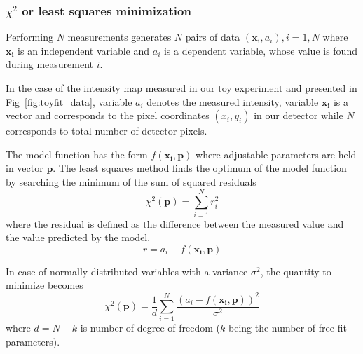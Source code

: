 \subsubsection*{$\chi^2$ or least squares minimization}
Performing $N$ measurements generates $N$ pairs of data $(\mathbf{x_{i}}, a_{i}), i=1,N$ where 
$\mathbf{x_{i}}$ is an independent variable and $a_{i}$ is a dependent variable, whose
value is found during measurement $i$.

In the case of the intensity map measured in our toy experiment 
and presented in Fig~\ref{fig:toyfit_data}, variable $a_{i}$ denotes
the measured intensity, variable $\mathbf{x_{i}}$ is a vector and
corresponds to the pixel coordinates $(x_{i}, y_{i})$ in our detector while $N$ corresponds 
to total number of detector pixels.

The model function has the form
$f(\mathbf{x_{i}},\mathbf{p})$
where adjustable parameters are held in vector $\mathbf{p}$.
The least squares method finds the optimum of the model function by searching the minimum of the sum of squared
residuals
$$ \chi^{2}(\mathbf{p}) = \sum_{i=1}^{N}r_{i}^{2}$$
where the residual is defined as the difference between the measured value and the value predicted by the model.
$$r = a_{i} - f(\mathbf{x_{i}},\mathbf{p})$$

In case of normally distributed variables with a variance $\sigma^2$,
the quantity to minimize becomes
$$ \chi^{2}(\mathbf{p}) =
\frac{1}{d}
\sum_{i=1}^{N}  
\frac{ (a_{i} - f(\mathbf{x_{i}},\mathbf{p}))^2}{\sigma^2}   $$
where $d=N-k$ is number of degree of freedom ($k$ being the number of free fit parameters).

